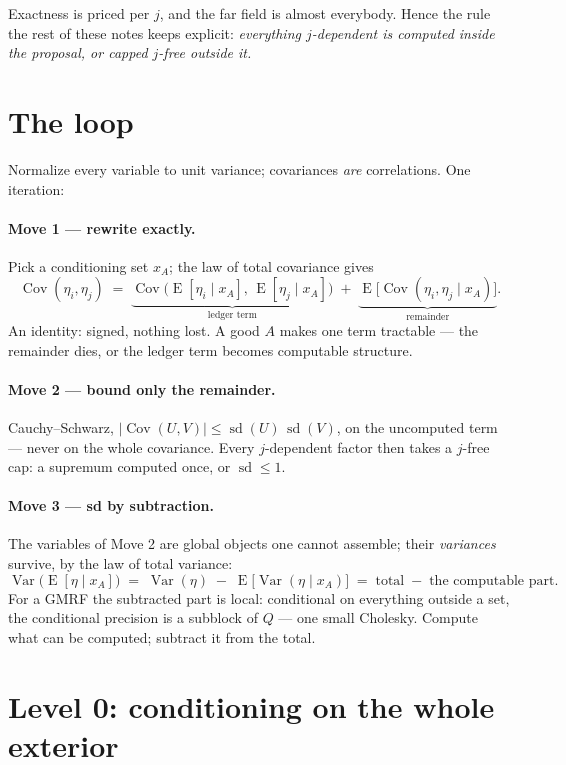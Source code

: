 \documentclass[11pt]{article}
\theoremstyle{remark}
\newcommand{\Var}{\operatorname{Var}}
\newcommand{\Cov}{\operatorname{Cov}}
\newcommand{\E}{\operatorname{E}}
\newcommand{\sd}{\operatorname{sd}}
\begin{document}
Exactness is priced per $j$, and the far field is almost everybody.
Hence the rule the rest of these notes keeps explicit: \emph{everything
$j$-dependent is computed inside the proposal, or capped $j$-free
outside it.}

\section{The loop}\label{sec:loop}

Normalize every variable to unit variance; covariances \emph{are}
correlations.  One iteration:

\paragraph{Move 1 — rewrite exactly.}  Pick a conditioning set $x_A$;
the law of total covariance gives
\[
  \Cov(\eta_i, \eta_j)
  \;=\;
  \underbrace{\Cov\bigl(\E[\eta_i \mid x_A],\, \E[\eta_j \mid
  x_A]\bigr)}_{\text{ledger term}}
  \;+\;
  \underbrace{\E\bigl[\Cov(\eta_i, \eta_j \mid x_A)\bigr]}_{\text{remainder}} .
\]
An identity: signed, nothing lost.  A good $A$ makes one term
tractable --- the remainder dies, or the ledger term becomes computable
structure.

\paragraph{Move 2 — bound only the remainder.}  Cauchy--Schwarz,
$|\Cov(U,V)| \le \sd(U)\,\sd(V)$, on the uncomputed term --- never on
the whole covariance.  Every $j$-dependent factor then takes a $j$-free
cap: a supremum computed once, or $\sd \le 1$.

\paragraph{Move 3 — sd by subtraction.}  The variables of Move 2 are
global objects one cannot assemble; their \emph{variances} survive,
by the law of total variance:
\[
  \Var\bigl(\E[\eta \mid x_A]\bigr)
  \;=\; \Var(\eta) \;-\; \E\bigl[\Var(\eta \mid x_A)\bigr]
  \;=\; \text{total} \;-\; \text{the computable part.}
\]
For a GMRF the subtracted part is local: conditional on everything
outside a set, the conditional precision is a subblock of $Q$ --- one
small Cholesky.  Compute what can be computed; subtract it from the
total.

\section{Level 0: conditioning on the whole exterior}\label{sec:level0}
\end{document}
